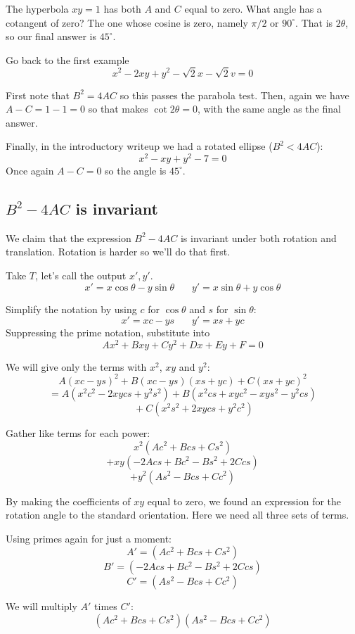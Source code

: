 \documentclass[11pt, oneside]{article}
\begin{document}
The hyperbola $xy = 1$ has both $A$ and $C$ equal to zero.  What angle has a cotangent of zero?  The one whose cosine is zero, namely $\pi/2$ or $90^{\circ}$.  That is $2 \theta$, so our final answer is $45^{\circ}$.

Go back to the first example
\[ x^2 - 2xy + y^2 - \sqrt{2} x - \sqrt{2} v  = 0 \]

First note that $B^2 = 4AC$ so this passes the parabola test.  Then, again we have $A - C = 1 - 1 = 0$ so that makes $\cot 2 \theta = 0$, with the same angle as the final answer.

Finally, in the introductory writeup we had a rotated ellipse ($B^2 < 4AC$):
\[ x^2 - xy + y^2 - 7 = 0 \]
Once again $A - C = 0$ so the angle is $45^{\circ}$.

\subsection*{$B^2 - 4AC$ is invariant}

We claim that the expression $B^2 - 4AC$ is invariant under both rotation and translation.  Rotation is harder so we'll do that first.

Take $T$, let's call the output $x',y'$.
\[ x' = x \cos \theta - y \sin \theta \ \ \ \ \ \ \ \ y' = x \sin \theta + y \cos \theta \]

Simplify the notation by using $c$ for $\cos \theta$ and $s$ for $\sin \theta$:
\[ x' = xc - ys \ \ \ \ \ \ \ \ y' = xs + yc \]
Suppressing the prime notation, substitute into
\[ Ax^2 + Bxy + Cy^2 + Dx + Ey + F = 0 \]

We will give only the terms with $x^2$, $xy$ and $y^2$:
\[ A(xc - ys)^2 + B(xc - ys)(xs + yc) + C(xs + yc)^2 \]
\[ = A(x^2c^2 - 2xycs + y^2s^2) + B(x^2cs + xyc^2 - xys^2 - y^2cs) \]
\[ \ \ \ \ \ \ \ \ \ \ + C(x^2s^2 + 2xycs + y^2c^2) \]

Gather like terms for each power:
\[ x^2(Ac^2 + Bcs + Cs^2) \]
\[ + xy(-2Acs + Bc^2 - Bs^2 + 2Ccs) \]
\[ + y^2(As^2 - Bcs + Cc^2) \]

By making the coefficients of $xy$ equal to zero, we found an expression for the rotation angle to the standard orientation.  Here we need all three sets of terms.

Using primes again for just a moment:
\[ A' = (Ac^2 + Bcs + Cs^2) \]
\[ B' = (-2Acs + Bc^2 - Bs^2 + 2Ccs) \]
\[ C' = (As^2 - Bcs + Cc^2) \]

We will multiply $A'$ times $C'$:
\[(Ac^2 + Bcs + Cs^2)(As^2 - Bcs + Cc^2) \]
\end{document}
